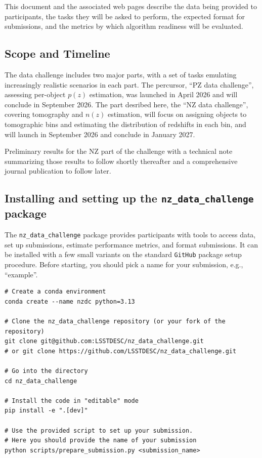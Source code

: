 \documentclass[11pt,twoside,letterpaper,onecolumn,english]{article}
\begin{document}
This document and the associated web pages describe the data being
provided to participants, the tasks they will be asked to perform, the
expected format for submissions, and the metrics by which algorithm
readiness will be evaluated.


\subsection{Scope and Timeline}

The data challenge includes two major parts, with a set of
tasks emulating increasingly realistic scenarios in each part. The
percursor, ``PZ data challenge'', assessing per-object $p(z)$ estimation,
was launched in April 2026 and will conclude in September 2026.
The part desribed here, the ``NZ data challenge'', covering tomography and $n(z)$ estimation, will focus on assigning
objects to tomographic bins and estimating the distribution of redshifts in
each bin, and will launch in September 2026 and conclude in January 2027.

Preliminary results for the NZ part of the challenge 
with a technical note summarizing those results to follow shortly thereafter and
a comprehensive journal publication to follow later.


\subsection{Installing and setting up the \texttt{nz\_data\_challenge}
  package}

The \texttt{nz\_data\_challenge} package provides participants with tools
to access data, set up submissions, estimate performance metrics, and
format submissions.  It can be installed with a few small
variants on the standard \texttt{GitHub} package setup procedure.
Before starting, you should pick a name for your submission, e.g., ``example''.

\begin{verbatim}
# Create a conda environment
conda create --name nzdc python=3.13

# Clone the nz_data_challenge repository (or your fork of the repository)
git clone git@github.com:LSSTDESC/nz_data_challenge.git
# or git clone https://github.com/LSSTDESC/nz_data_challenge.git

# Go into the directory
cd nz_data_challenge

# Install the code in "editable" mode
pip install -e ".[dev]"

# Use the provided script to set up your submission.
# Here you should provide the name of your submission
python scripts/prepare_submission.py <submission_name>
\end{verbatim}
\end{document}
